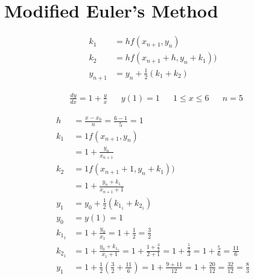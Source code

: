 \section{Modified Euler's Method}
	\begin{align}
		k_{1} &= hf(x_{n+1}, y_{n})& \\
		k_{2} &= hf(x_{n+1}+h, y_{n} + k_{1}))& \\
		y_{n+1} &= y_{n} + \frac{1}{2}(k_{1}+k_{2})&
	\end{align}

	\begin{align}
		&\frac{dy}{dx} = 1 + \frac{y}{x}&
		&y(1) = 1&
		&1 \leq x \leq 6&
		&n = 5&
	\end{align}

	\begin{align}
		h &= \frac{x - x_{0}}{n} = \frac{6-1}{5} = 1& \\
		k_{1} &= 1f(x_{n+1}, y_{n})& \\
		&= 1 + \frac{y_{n}}{x_{n+1}}& \\
		k_{2} &= 1f(x_{n+1}+1, y_{n} + k_{1}))& \\
		&= 1 + \frac{y_{n} + k_{1}}{x_{n+1} + 1}& \\
		y_{1} &= y_{0} + \frac{1}{2}(k_{1_{1}}+k_{2_{1}})& \\
		y_{0} &= y(1) = 1& \\
		k_{1_{1}} &= 1 + \frac{y_{0}}{x_{1}} = 1 + \frac{1}{2} = \frac{3}{2}& \\
		k_{2_{1}} &= 1 + \frac{y_{0} + k_{1_{1}}}{x_{1} + 1} = 1 + \frac{1 + \frac{3}{2}}{2 + 1} = 1 + \frac{\frac{5}{2}}{3} = 1 + \frac{5}{6} = \frac{11}{6}& \\
		y_{1} &= 1 + \frac{1}{2}\left(\frac{3}{2}+\frac{11}{6}\right) = 1 + \frac{9 + 11}{12} = 1 + \frac{20}{12} = \frac{32}{12} = \frac{8}{3}&
	\end{align}

